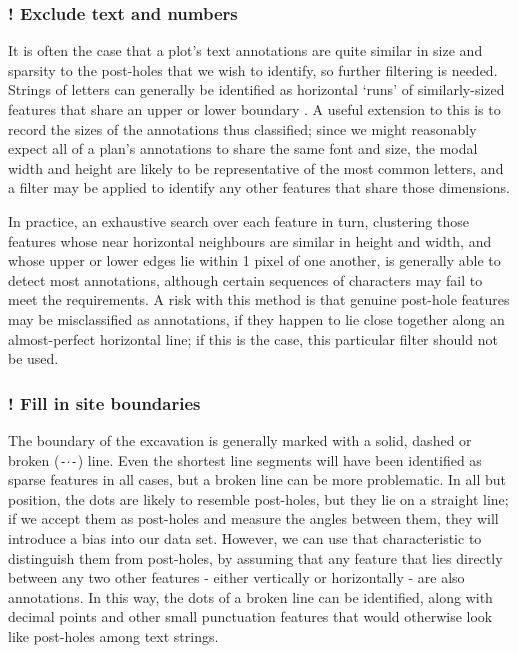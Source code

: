\documentclass[../../ArchStats.tex]{subfiles}
\begin{document}
\subsubsection{! Exclude text and numbers}

It is often the case that a plot's text annotations are quite similar in size and sparsity to the post-holes that we wish to identify, so further filtering is needed. Strings of letters can generally be identified as horizontal `runs' of similarly-sized features that share an upper or lower boundary . A useful extension to this is to record the sizes of the annotations thus classified; since we might reasonably expect all of a plan's annotations to share the same font and size, the modal width and height are likely to be representative of the most common letters, and a filter may be applied to identify any other features that share those dimensions. 

In practice, an exhaustive search over each feature in turn, clustering those features whose near horizontal neighbours are similar in height and width, and whose upper or lower edges lie within 1 pixel of one another, is generally able to detect most annotations, although certain sequences of characters may fail to meet the requirements. A risk with this method is that genuine post-hole features may be misclassified as annotations, if they happen to lie close together along an almost-perfect horizontal line; if this is the case, this particular filter should not be used. 


\subsubsection{! Fill in site boundaries}

The boundary of the excavation is generally marked with a solid, dashed or broken (\texttt{-$\cdot$-}) line. Even the shortest line segments will have been identified as sparse features in all cases, but a broken line can be more problematic. In all but position, the dots are likely to resemble post-holes, but they lie on a straight line; if we accept them as post-holes and measure the angles between them, they will introduce a bias into our data set. However, we can use that characteristic to distinguish them from post-holes, by assuming that any feature that lies directly between any two other features - either vertically or horizontally - are also annotations. In this way, the dots of a broken line can be identified, along with decimal points and other small punctuation features that would otherwise look like post-holes among text strings.
\end{document}
